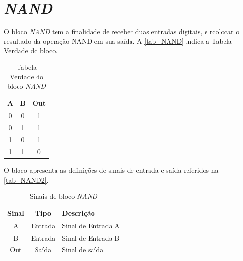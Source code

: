 \renewcommand{\NomeBloco}{\emph{NAND}}
\renewcommand{\NomeBlocoNoIt}{NAND}
\renewcommand{\NomePTab}{tab_\NomeBlocoNoIt}
\renewcommand{\NomeSTab}{tab_\NomeBlocoNoIt2}
\renewcommand{\NomePFig}{fig_\NomeBlocoNoIt}
\renewcommand{\NomeSFig}{fig_\NomeBlocoNoIt2}
\renewcommand{\NomeTTab}{tab_\NomeBlocoNoIt3}

\section{\NomeBloco}
\label{inversor1}

O bloco \NomeBloco{} tem a finalidade de receber duas entradas digitais, e rcolocar o resultado da opera{\c c}\~ao NAND em sua sa\'ida. A \autoref{\NomePTab} indica a Tabela Verdade do bloco.

\begin{table}[htbp]

\caption{Tabela Verdade do bloco \NomeBloco}%
\label{\NomePTab}
\centering
\begin{tabular}{ccc}
\toprule
    A & B & Out \\
    \midrule \midrule
    0 & 0 & 1 \\
    \midrule
    0 & 1 & 1\\
    \midrule
    1 & 0 & 1\\
    \midrule
    1 & 1 & 0\\
\bottomrule

\end{tabular}
\end{table}

O bloco apresenta as defini{\c c}\~oes de sinais de entrada e sa\'ida referidos na \autoref{\NomeSTab}.

\begin{table}[htbp]
\caption{Sinais do bloco \NomeBloco}
\label{\NomeSTab}
\centering
\begin{tabular}{ccl}

    \toprule
    Sinal & Tipo    & Descri{\c c}\~ao        \\
    \midrule \midrule
    A    & Entrada & Sinal de Entrada A \\
    \midrule
    B    & Entrada & Sinal de Entrada B \\
    \midrule
    Out    & Sa\'ida & Sinal de sa\'ida \\
    \bottomrule
\end{tabular}
\end{table}

